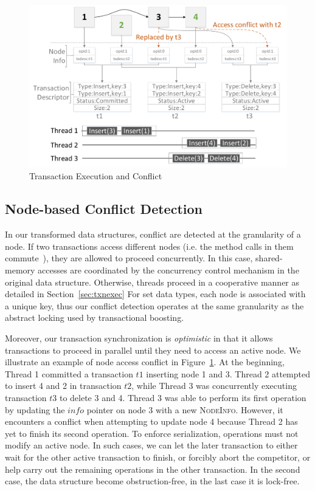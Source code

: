 \documentclass[10pt,conference,compsocconf]{IEEEtran}
\begin{document}
\begin{figure}[h]
    \centering
    \includegraphics[width=1\columnwidth]{figure/lfttconflict.pdf}
    \caption{Transaction Execution and Conflict}
    \label{fig:lfttconflict}
\end{figure}

\subsection{Node-based Conflict Detection}
In our transformed data structures, conflict are detected at the granularity of a node. 
If two transactions access different nodes (i.e. the method calls in them commute~\cite{herlihy2008transactional}), they are allowed to proceed concurrently. 
In this case, shared-memory accesses are coordinated by the concurrency control mechanism in the original data structure.
Otherwise, threads proceed in a cooperative manner as detailed in Section~\ref{sec:txnexec}
For set data types, each node is associated with a unique key, thus our conflict detection operates at the same granularity as the abstract locking used by transactional boosting.

Moreover, our transaction synchronization is \emph{optimistic} in that it allows transactions to proceed in parallel until they need to access an active node.
We illustrate an example of node access conflict in Figure~\ref{fig:lfttconflict}.
At the beginning, Thread 1 committed a transaction $t1$ inserting node 1 and 3. 
Thread 2 attempted to insert 4 and 2 in transaction $t2$, while Thread 3 was concurrently executing transaction $t3$ to delete 3 and 4.
Thread 3 was able to perform its first operation by updating the $info$ pointer on node 3 with a new \textsc{NodeInfo}.
However, it encounters a conflict when attempting to update node 4 because Thread 2 has yet to finish its second operation.
To enforce serialization, operations must not modify an active node. 
In such cases, we can let the later transaction to either wait for the other active transaction to finish, or forcibly abort the competitor, or help carry out the remaining operations in the other transaction.
In the second case, the data structure become obstruction-free, in the last case it is lock-free.
\end{document}
